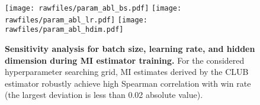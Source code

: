 \begin{figure}[h]
    \centering
    \texttt{[image: rawfiles/param\_abl\_bs.pdf]}
    \texttt{[image: rawfiles/param\_abl\_lr.pdf]}
    \texttt{[image: rawfiles/param\_abl\_hdim.pdf]}
    
    \caption{\textbf{Sensitivity analysis for batch size, learning rate, and hidden dimension during MI estimator training.} For the considered hyperparameter searching grid, MI estimates derived by the CLUB estimator robustly achieve high Spearman correlation with win rate (the largest deviation is less than 0.02 absolute value).}
    \label{fig:param_ablation}
\end{figure}